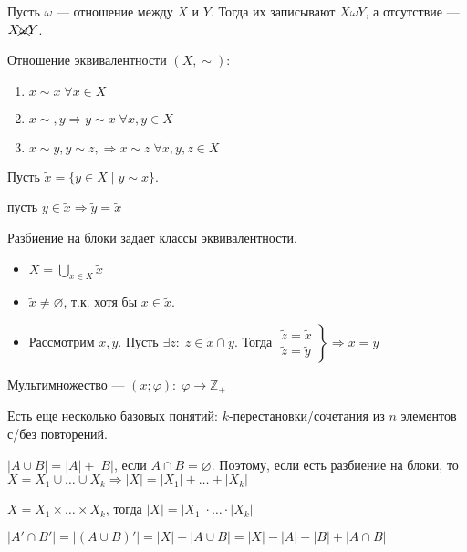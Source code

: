 Пусть $\omega$ --- отношение между $X$ и $Y$. Тогда их записывают $X \omega Y$, а отсутствие --- $X \xcancel{\omega} Y$. 
\begin{definition}
    Отношение эквивалентности $(X, \sim)$:
     \begin{enumerate}
         \item $x \sim x \; \forall x \in X$
         \item $x \sim, y \Rightarrow y \sim x \; \forall x, y \in X$
         \item  $x \sim y, y \sim z, \Rightarrow x \sim z\; \forall x, y, z \in X$
    \end{enumerate}
\end{definition}
Пусть $\widetilde{x}= \{ y \in X \; \vert \; y \sim x\}$. 
\begin{property}
пусть $y \in \widetilde{x} \Rightarrow \widetilde{y} = \widetilde{x}$ 
\end{property}

\begin{theorem}
    Разбиение на блоки задает классы эквивалентности.
\end{theorem}
    \begin{itemize}
        \item $X = \bigcup_{x \in X} \widetilde{x}$
        \item $\widetilde{x} \neq \varnothing$, т.к. хотя бы $x \in \widetilde{x}$.
        \item Рассмотрим  $\widetilde{x}, \widetilde{y}$. Пусть $\exists z: \; z \in \widetilde{x} \cap \widetilde{y}$. Тогда  $\left. \begin{array}{l} \widetilde{z} = \widetilde{x} \\ \widetilde{z} = \widetilde{y} \end{array} \right\} \Rightarrow \widetilde{x} = \widetilde{y}$
    \end{itemize}

\begin{definition}
    Мультимножество --- $(x; \varphi): \; \varphi \to \mathbb{Z}_+$ 
\end{definition}

Есть еще несколько базовых понятий: $k$-перестановки/сочетания из $n$ элементов с/без повторений.

$|A \cup B| = |A| + |B|$, если  $A \cap B = \varnothing$. Поэтому, если есть разбиение на блоки, то  $X=X_1\cup\ldots\cup X_k \Rightarrow |X| = |X_1|+\ldots+|X_k|$ 

$X = X_1 \times \ldots \times X_k$, тогда $|X| = |X_1| \cdot \ldots \cdot |X_k|$ 

$|A' \cap B'| = |(A \cup B)'| = |X| - |A \cup B| = |X| - |A| - |B| + |A \cap B|$
